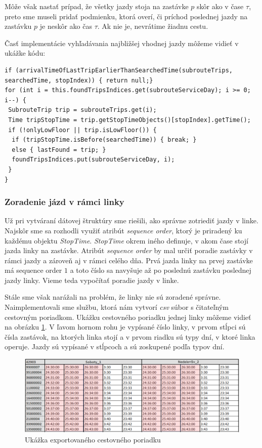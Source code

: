 Môže však nastať prípad, že všetky jazdy stoja na zastávke $p$ skôr ako v čase $\tau$, preto sme museli pridať podmienku, ktorá overí, či príchod poslednej jazdy na zastávku $p$ je neskôr ako čas $\tau$. Ak nie je, nevrátime žiadnu cestu. 

Časť implementácie vyhľadávania najbližšej vhodnej jazdy môžeme vidieť v ukážke kódu: 
\begin{lstlisting}
if (arrivalTimeOfLastTripEarlierThanSearchedTime(subrouteTrips, searchedTime, stopIndex)) { return null;}
for (int i = this.foundTripsIndices.get(subrouteServiceDay); i >= 0; i--) {
 SubrouteTrip trip = subrouteTrips.get(i);
 Time tripStopTime = trip.getStopTimeObjects()[stopIndex].getTime();
 if (!onlyLowFloor || trip.isLowFloor()) {
  if (tripStopTime.isBefore(searchedTime)) { break; }
  else { lastFound = trip; }
  foundTripsIndices.put(subrouteServiceDay, i);
 }
}
\end{lstlisting}

\subsubsection{Zoradenie jázd v rámci linky}
Už pri vytváraní dátovej štruktúry sme riešili, ako správne zotriediť jazdy v linke. Najskôr sme sa rozhodli využiť atribút \textit{sequence order}, ktorý je priradený ku každému objektu \textit{StopTime}. \textit{StopTime} okrem iného definuje, v akom čase stojí jazda linky na zastávke. Atribút \textit{sequence order} by mal určiť poradie zastávky v rámci jazdy a zároveň aj v rámci celého dňa. Prvá jazda linky na prvej zastávke má sequence order $1$ a toto číslo sa navyšuje až po poslednú zastávku poslednej jazdy linky. Vieme teda vypočítať poradie jazdy v linke. 

Stále sme však narážali na problém, že linky nie sú zoradené správne. Naimplementovali sme službu, ktorá nám vytvorí \textit{csv} súbor s čitateľným cestovným poriadkom. Ukážku cestovného poriadku jednej linky môžeme vidieť na obrázku \ref{fig:weird-times}. V ľavom hornom rohu je vypísané číslo linky, v prvom stĺpci sú čísla zastávok, na ktorých linka stojí a v prvom riadku sú typy dní, v ktoré linka operuje. Jazdy sú vypísané v stĺpcoch a sú zoskupené podľa typov dní. 

\begin{figure}[H]
\centerline{\includegraphics[width=1\textwidth]{images/weird-times-1}}
\caption[Ukážka exportovaného cestovného poriadku]{Ukážka exportovaného cestovného poriadku}
\label{fig:weird-times}
\end{figure} 

